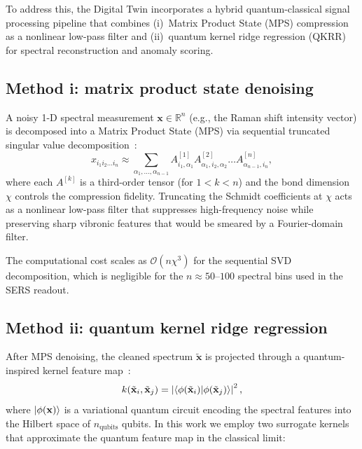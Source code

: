 \documentclass[11pt,a4paper]{article}
\begin{document}
To address this, the Digital Twin incorporates a hybrid quantum-classical signal processing pipeline that combines (i)~Matrix Product State (MPS) compression as a nonlinear low-pass filter and (ii)~quantum kernel ridge regression (QKRR) for spectral reconstruction and anomaly scoring.

\subsection{Method i: matrix product state denoising}

A noisy 1-D spectral measurement $\mathbf{x} \in \mathbb{R}^n$ (e.g., the Raman shift intensity vector) is decomposed into a Matrix Product State (MPS) via sequential truncated singular value decomposition~\cite{Stoudenmire2016}:
\begin{equation}
x_{i_1 i_2 \dots i_n} \approx \sum_{\alpha_1,\dots,\alpha_{n-1}} A^{[1]}_{i_1,\alpha_1} A^{[2]}_{\alpha_1,i_2,\alpha_2} \dots A^{[n]}_{\alpha_{n-1},i_n},
\label{eq:SI_mps_decomp}
\end{equation}
where each $A^{[k]}$ is a third-order tensor (for $1<k<n$) and the bond dimension $\chi$ controls the compression fidelity. Truncating the Schmidt coefficients at $\chi$ acts as a nonlinear low-pass filter that suppresses high-frequency noise while preserving sharp vibronic features that would be smeared by a Fourier-domain filter.

The computational cost scales as $\mathcal{O}(n \chi^3)$ for the sequential SVD decomposition, which is negligible for the $n \approx 50$--$100$ spectral bins used in the SERS readout.

\subsection{Method ii: quantum kernel ridge regression}

After MPS denoising, the cleaned spectrum $\tilde{\mathbf{x}}$ is projected through a quantum-inspired kernel feature map~\cite{Havlicek2019}:
\begin{equation}
k(\tilde{\mathbf{x}}_i, \tilde{\mathbf{x}}_j) = \left| \braket{\phi(\tilde{\mathbf{x}}_i)}{\phi(\tilde{\mathbf{x}}_j)} \right|^2,
\label{eq:SI_quantum_kernel}
\end{equation}
where $\ket{\phi(\mathbf{x})}$ is a variational quantum circuit encoding the spectral features into the Hilbert space of $n_{\mathrm{qubits}}$ qubits. In this work we employ two surrogate kernels that approximate the quantum feature map in the classical limit:
\end{document}
